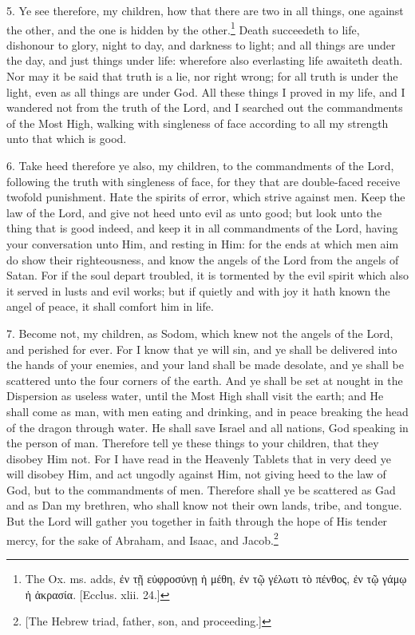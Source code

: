 5. Ye see therefore, my children, how that there are two in all things, one against the other, and the one is hidden by the other.\footnote{The Ox. ms. adds, \textgreek{ἐν τῇ εὐφροσύνῃ ἡ μέθη, ἐν τῷ γέλωτι τὸ πένθος, ἐν τῷ γάμῳ ἡ ἀκρασία}. [Ecclus. xlii. 24.]} Death succeedeth to life, dishonour to glory, night to day, and darkness to light; and all things are under the day, and just things under life: wherefore also everlasting life awaiteth death. Nor may it be said that truth is a lie, nor right wrong; for all truth is under the light, even as all things are under God. All these things I proved in my life, and I wandered not from the truth of the Lord, and I searched out the commandments of the Most High, walking with singleness of face according to all my strength unto that which is good.

6. Take heed therefore ye also, my children, to the commandments of the Lord, following the truth with singleness of face, for they that are double-faced receive twofold punishment. Hate the spirits of error, which strive against men. Keep the law of the Lord, and give not heed unto evil as unto good; but look unto the thing that is good indeed, and keep it in all commandments of the Lord, having your conversation unto Him, and resting in Him: for the ends at which men aim do show their righteousness, and know the angels of the Lord from the angels of Satan. For if the soul depart troubled, it is tormented by the evil spirit which also it served in lusts and evil works; but if quietly and with joy it hath known the angel of peace, it shall comfort him in life.

7. Become not, my children, as Sodom, which knew not the angels of the Lord, and perished for ever. For I know that ye will sin, and ye shall be delivered into the hands of your enemies, and your land shall be made desolate, and ye shall be scattered unto the four corners of the earth. And ye shall be set at nought in the Dispersion as useless water, until the Most High shall visit the earth; and He shall come as man, with men eating and drinking, and in peace breaking the head of the dragon through water. He shall save Israel and all nations, God speaking in the person of man. Therefore tell ye these things to your children, that they disobey Him not. For I have read in the Heavenly Tablets that in very deed ye will disobey Him, and act ungodly against Him, not giving heed to the law of God, but to the commandments of men. Therefore shall ye be scattered as Gad and as Dan my brethren, who shall know not their own lands, tribe, and tongue. But the Lord will gather you together in faith through the hope of His tender mercy, for the sake of Abraham, and Isaac, and Jacob.\footnote{[The Hebrew triad, father, son, and proceeding.]}

